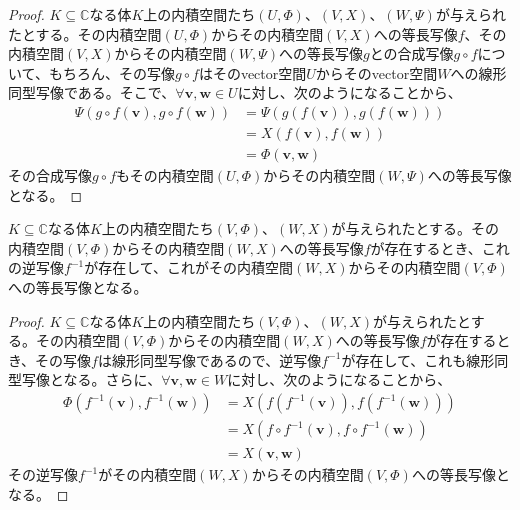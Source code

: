 \documentclass[dvipdfmx]{jsarticle}
\begin{document}
\begin{proof}
$K \subseteq \mathbb{C}$なる体$K$上の内積空間たち$(U,\varPhi )$、$(V,X)$、$(W,\varPsi )$が与えられたとする。その内積空間$(U,\varPhi )$からその内積空間$(V,X)$への等長写像$f$、その内積空間$(V,X)$からその内積空間$(W,\varPsi )$への等長写像$g$との合成写像$g \circ f$について、もちろん、その写像$g \circ f$はそのvector空間$U$からそのvector空間$W$への線形同型写像である。そこで、$\forall\mathbf{v},\mathbf{w} \in U$に対し、次のようになることから、
\begin{align*}
\varPsi \left( g \circ f\left( \mathbf{v} \right),g \circ f\left( \mathbf{w} \right) \right) &= \varPsi \left( g\left( f\left( \mathbf{v} \right) \right),g\left( f\left( \mathbf{w} \right) \right) \right)\\
&= X\left( f\left( \mathbf{v} \right),f\left( \mathbf{w} \right) \right)\\
&= \varPhi \left( \mathbf{v},\mathbf{w} \right)
\end{align*}
その合成写像$g \circ f$もその内積空間$(U,\varPhi )$からその内積空間$(W,\varPsi )$への等長写像となる。
\end{proof}
\begin{thm}\label{2.3.7.2}
$K \subseteq \mathbb{C}$なる体$K$上の内積空間たち$(V,\varPhi )$、$(W,X)$が与えられたとする。その内積空間$(V,\varPhi )$からその内積空間$(W,X)$への等長写像$f$が存在するとき、これの逆写像$f^{- 1}$が存在して、これがその内積空間$(W,X)$からその内積空間$(V,\varPhi )$への等長写像となる。
\end{thm}
\begin{proof}
$K \subseteq \mathbb{C}$なる体$K$上の内積空間たち$(V,\varPhi )$、$(W,X)$が与えられたとする。その内積空間$(V,\varPhi )$からその内積空間$(W,X)$への等長写像$f$が存在するとき、その写像$f$は線形同型写像であるので、逆写像$f^{- 1}$が存在して、これも線形同型写像となる。さらに、$\forall\mathbf{v},\mathbf{w} \in W$に対し、次のようになることから、
\begin{align*}
\varPhi \left( f^{- 1}\left( \mathbf{v} \right),f^{- 1}\left( \mathbf{w} \right) \right) &= X\left( f\left( f^{- 1}\left( \mathbf{v} \right) \right),f\left( f^{- 1}\left( \mathbf{w} \right) \right) \right)\\
&= X\left( f \circ f^{- 1}\left( \mathbf{v} \right),f \circ f^{- 1}\left( \mathbf{w} \right) \right)\\
&= X\left( \mathbf{v},\mathbf{w} \right)
\end{align*}
その逆写像$f^{- 1}$がその内積空間$(W,X)$からその内積空間$(V,\varPhi )$への等長写像となる。
\end{proof}
\end{document}
